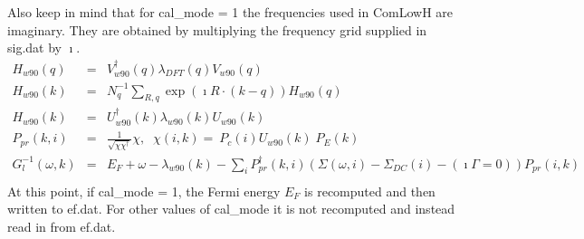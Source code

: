 \documentclass[aps,prb,singlecolumn,preprintnumbers,amsmath,amssymb]{revtex4}
\begin{document}
Also keep in mind that for cal\_mode = 1 the  frequencies used in ComLowH are imaginary. They are obtained by multiplying the frequency grid supplied in sig.dat by $\imath$.
\begin{eqnarray}
H_{w90}(q) &=&  V_{w90}^\dagger(q) \lambda_{DFT}(q) V_{w90}(q) \\ %
H_{w90}(k) &=& N_q^{-1} \sum_{R,q} \exp(\imath R \cdot (k -q)) H_{w90}(q) \\
 H_{w90}(k) & = &U_{w90}^\dagger(k)   \lambda_{w90}(k) U_{w90}(k)  \\
P_{pr}(k,i) & = & \frac{1}{\sqrt{\chi \chi^\dagger}} \chi ,  \;\;\chi(i,k) = \ P_c(i) U_{w90}(k)\; P_E(k) \\ 
G_{l}^{-1}(\omega, k) &=& E_F +  \omega - \lambda_{w90}(k)  - \sum_i P_{pr}^\dagger(k,i) (\Sigma(\omega,i) - \Sigma_{DC}(i) -  (\imath \Gamma=0))  P_{pr}(i,k) \nonumber \\ %
\end{eqnarray}
At this point, if cal\_mode = 1, the Fermi energy $E_F$ is recomputed and then written to ef.dat.  For other values of cal\_mode it is not recomputed and instead read in from ef.dat.
\end{document}
